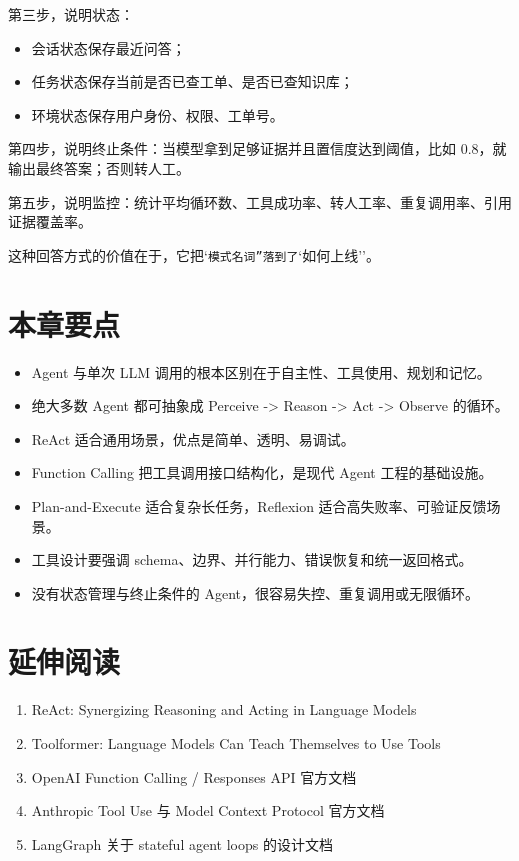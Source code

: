 第三步，说明状态：


\begin{itemize}[leftmargin=2em]
\item 会话状态保存最近问答；
\item 任务状态保存当前是否已查工单、是否已查知识库；
\item 环境状态保存用户身份、权限、工单号。
\end{itemize}

第四步，说明终止条件：当模型拿到足够证据并且置信度达到阈值，比如 0.8，就输出最终答案；否则转人工。


第五步，说明监控：统计平均循环数、工具成功率、转人工率、重复调用率、引用证据覆盖率。


这种回答方式的价值在于，它把`\texttt{模式名词''落到了}`如何上线''。


\section{本章要点}

\begin{itemize}[leftmargin=2em]
\item Agent 与单次 LLM 调用的根本区别在于自主性、工具使用、规划和记忆。
\item 绝大多数 Agent 都可抽象成 Perceive -> Reason -> Act -> Observe 的循环。
\item ReAct 适合通用场景，优点是简单、透明、易调试。
\item Function Calling 把工具调用接口结构化，是现代 Agent 工程的基础设施。
\item Plan-and-Execute 适合复杂长任务，Reflexion 适合高失败率、可验证反馈场景。
\item 工具设计要强调 schema、边界、并行能力、错误恢复和统一返回格式。
\item 没有状态管理与终止条件的 Agent，很容易失控、重复调用或无限循环。
\end{itemize}

\section{延伸阅读}

\begin{enumerate}[leftmargin=2em]
\item ReAct: Synergizing Reasoning and Acting in Language Models
\item Toolformer: Language Models Can Teach Themselves to Use Tools
\item OpenAI Function Calling / Responses API 官方文档
\item Anthropic Tool Use 与 Model Context Protocol 官方文档
\item LangGraph 关于 stateful agent loops 的设计文档
\end{enumerate}
